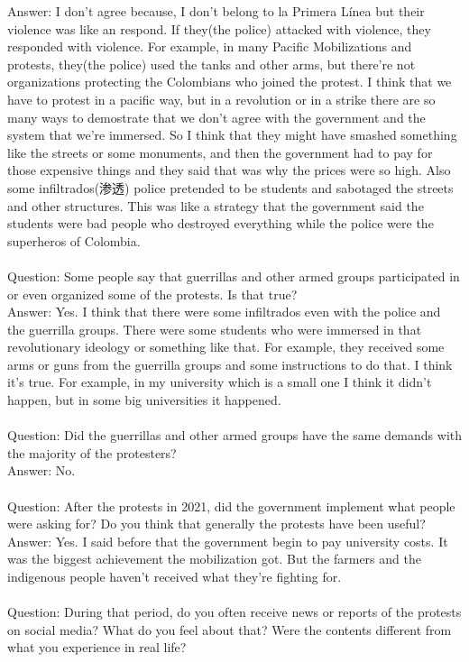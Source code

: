 \documentclass{phyasgn}\usepackage{nag}
\begin{document}
Answer: I don’t agree because, I don’t belong to la Primera Línea but their violence was like an respond. If they(the police) attacked with violence, they responded with violence. For example, in many Pacific Mobilizations and protests, they(the police) used the tanks and other arms, but there’re not organizations protecting the Colombians who joined the protest. I think that we have to protest in a pacific way, but in a revolution or in a strike there are so many ways to demostrate that we don’t agree with the government and the system that we’re immersed. So I think that they might have smashed something like the streets or some monuments, and then the government had to pay for those expensive things and they said that was why the prices were so high. Also some infiltrados(渗透) police pretended to be students and sabotaged the streets and other structures. This was like a strategy that the government said the students were bad people who destroyed everything while the police were the superheros of Colombia.\\
\\
Question: Some people say that guerrillas and other armed groups participated in or even organized some of the protests. Is that true?\\
Answer: Yes. I think that there were some infiltrados even with the police and the guerrilla groups. There were some students who were immersed in that revolutionary ideology or something like that. For example, they received some arms or guns from the guerrilla groups and some instructions to do that. I think it’s true. For example, in my university which is a small one I think it didn’t happen, but in some big universities it happened.\\
\\
Question: Did the guerrillas and other armed groups have the same demands with the majority of the protesters?\\
Answer: No. \\
\\
Question: After the protests in 2021, did the government implement what people were asking for? Do you think that generally the protests have been useful?\\
Answer: Yes. I said before that the government begin to pay university costs. It was the biggest achievement the mobilization got. But the farmers and the indigenous people haven’t received what they’re fighting for.\\
\\
Question: During that period, do you often receive news or reports of the protests on social media? What do you feel about that? Were the contents different from what you experience in real life?\\
\end{document}
